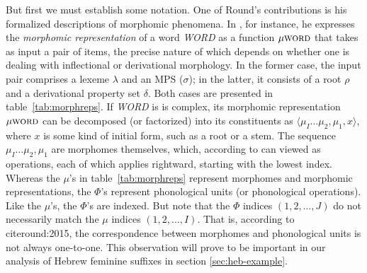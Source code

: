   But first we must establish some notation. 
  One of Round's contributions is his formalized descriptions of morphomic phenomena. In \cite{round:2011}, for instance, he expresses the \emph{morphomic representation} of a word \textit{WORD} as a function $\mu{\textsc{word}}$ that takes as input a pair of items, the precise nature %
  of which depends on whether one is dealing with inflectional or derivational morphology. In the former case, the input pair comprises a lexeme $\lambda$ and an \ac{MPS} ($\sigma$); in the latter, it consists of a root $\rho$ and a derivational property set $\delta$. Both cases are presented in table~\ref{tab:morphreps}. If \textit{WORD} is is complex, its morphomic representation $\mu{\textsc{word}}$ can be decomposed (or factorized) into its constituents as  $\langle  \mu_{I} \dots \mu_{2}, \mu_{1}, x \rangle$, where $x$ is some kind of initial form, such as a root or a stem. The sequence 
  $ \mu_{I} \dots \mu_{2}, \mu_{1}$ are morphomes themselves, which, according to \cite{round:2015} can viewed as operations, each of which applies rightward, starting with the lowest index. Whereas the $\mu$'s in table~\ref{tab:morphreps} represent morphomes and morphomic representations, the $\Phi$'s represent phonological units (or phonological operations). Like the $\mu$'s, the $\Phi$'s are indexed. But note that the $\Phi$ indices $(1,2,\dots,J)$ do not necessarily match the $\mu$ indices $(1,2,\dots,I)$. That is, according to cite{round:2015}, the correspondence between morphomes and phonological units is not always one-to-one. This observation will prove to be important in our analysis of Hebrew feminine suffixes in section \ref{sec:heb-example}.
